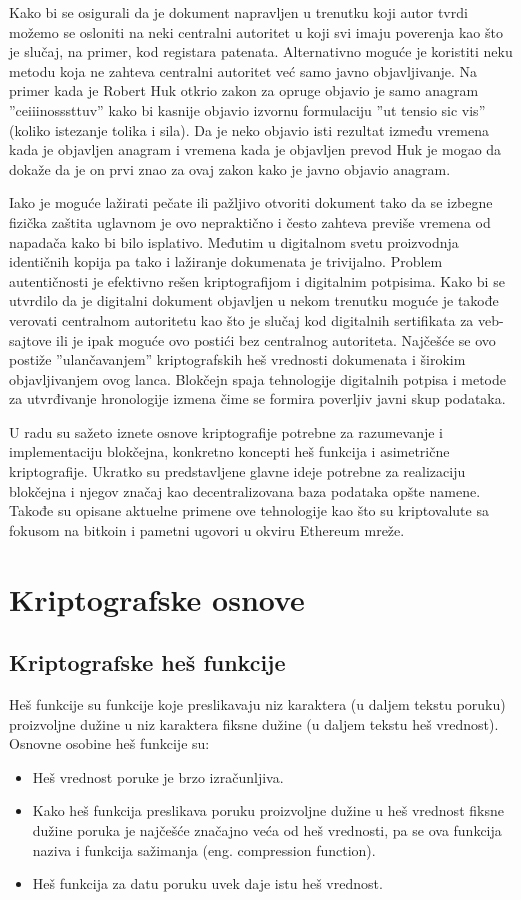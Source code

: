 \documentclass[a4paper]{article}
\begin{document}
Kako bi se osigurali da je dokument napravljen u trenutku koji autor tvrdi možemo se osloniti
na neki centralni autoritet u koji svi imaju poverenja kao što je slučaj, na primer, kod registara patenata.
Alternativno moguće je koristiti neku metodu koja ne zahteva centralni autoritet već samo
javno objavljivanje. Na primer kada je Robert Huk otkrio zakon za opruge objavio je samo anagram
''ceiiinosssttuv'' kako bi kasnije objavio izvornu formulaciju ''ut tensio sic vis'' (koliko istezanje tolika i sila).
Da je neko objavio isti rezultat između vremena kada je objavljen anagram i vremena kada je objavljen prevod
Huk je mogao da dokaže da je on prvi znao za ovaj zakon kako je javno objavio anagram.

Iako je moguće lažirati pečate ili pažljivo otvoriti dokument tako da se izbegne fizička zaštita
uglavnom je ovo nepraktično i često zahteva previše vremena od napadača kako bi bilo isplativo.
Međutim u digitalnom svetu proizvodnja identičnih kopija pa tako i lažiranje dokumenata je trivijalno.
Problem autentičnosti je efektivno rešen kriptografijom i digitalnim potpisima.
Kako bi se utvrdilo da je digitalni dokument objavljen u nekom trenutku moguće je takođe verovati
centralnom autoritetu kao što je slučaj kod digitalnih sertifikata za veb-sajtove ili je ipak moguće
ovo postići bez centralnog autoriteta. Najčešće se ovo postiže ''ulančavanjem'' kriptografskih heš vrednosti
dokumenata i širokim objavljivanjem ovog lanca. Blokčejn spaja tehnologije digitalnih potpisa i metode za utvrđivanje hronologije izmena čime
se formira poverljiv javni skup podataka.

U radu su sažeto iznete osnove kriptografije potrebne za razumevanje i implementaciju blokčejna, konkretno koncepti heš funkcija i asimetrične kriptografije. Ukratko su predstavljene glavne ideje potrebne za realizaciju blokčejna i njegov značaj kao decentralizovana baza podataka opšte namene. Takođe su opisane aktuelne primene ove tehnologije kao što su kriptovalute sa fokusom na bitkoin i pametni ugovori u okviru Ethereum mreže.

\section{Kriptografske osnove}	
\label{sec:kriptografske_osnove}

\subsection{Kriptografske heš funkcije}
Heš funkcije su funkcije koje preslikavaju niz karaktera (u daljem tekstu poruku) proizvoljne dužine u niz karaktera fiksne dužine (u daljem tekstu heš vrednost). Osnovne osobine heš funkcije su:
\begin{itemize}
\item Heš vrednost poruke je brzo izračunljiva.
\item Kako heš funkcija preslikava poruku proizvoljne dužine u heš vrednost fiksne dužine poruka je najčešće značajno veća od heš vrednosti, pa se ova funkcija naziva i funkcija sažimanja (eng. compression function).
\item Heš funkcija za datu poruku uvek daje istu heš vrednost.
\end{itemize}
\end{document}

